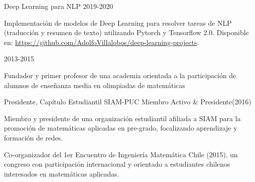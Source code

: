 
\begin{cventries}


  \cventry
  {Deep Learning para NLP}
  {}
  {}
  {2019-2020}{
  \begin{cvitems}
    \item {Implementación de modelos de Deep Learning para resolver tareas de NLP (traducción y resumen de texto) utilizando 
        Pytorch y Tensorflow 2.0. Disponible en: \url{https://github.com/AdolfoVillalobos/deep-learning-projects}.}
  \end{cvitems}
   }


\end{cventries}

\begin{cventries}
  {}
  {}
  {2013-2015}
  {\begin{cvitems}
    \item {Fundador y primer profesor de una academia orientada a la participación de alumnos de enseñanza media en olimpiadas de matemáticas}
  \end{cvitems}
}
  \cventry
  {Presidente, Capítulo Estudiantil SIAM-PUC}
  {}
  {}
  {Miembro Activo \& Presidente(2016)}
  {
    \begin{cvitems}
      \item {Miembro y presidente de una organización estudiantil afiliada a SIAM para la promoción de matemáticas aplicadas en pre-grado, focalizando
      aprendizaje y formación de redes.}
      \item {Co-organizador del 1er Encuentro de Ingeniería Matemática Chile (2015), un congreso con participación internacional
        y orientado a estudiantes chilenos interesados en matemáticas aplicadas.}
    \end{cvitems}
    }
\end{cventries}

 

